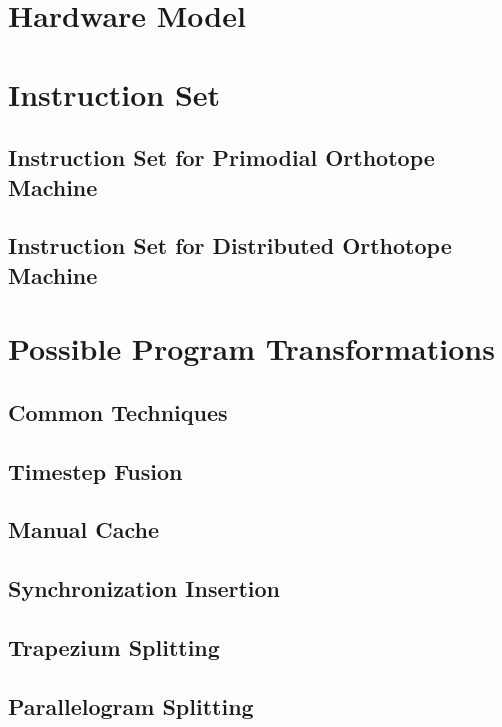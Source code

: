 \documentclass{article}
\begin{document}
\section{Hardware Model}
\section{Instruction Set}
\subsection{Instruction Set for Primodial Orthotope Machine}
\subsection{Instruction Set for Distributed Orthotope Machine}

\section{Possible Program Transformations}
\subsection{Common Techniques}
\subsection{Timestep Fusion}
\subsection{Manual Cache}
\subsection{Synchronization Insertion}
\subsection{Trapezium Splitting}
\subsection{Parallelogram Splitting}




\end{document}
